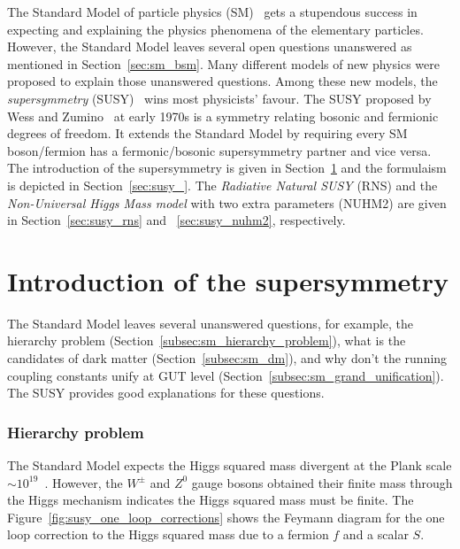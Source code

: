 The Standard Model of particle physics (SM)~\cite{BF02726525,0029-55826190469-2,PhysRevLett.19.1264,Herrero:1998eq,CBO9780511791406} gets a stupendous success in expecting and explaining the physics phenomena of the elementary particles.
However, the Standard Model leaves several open questions unanswered as mentioned in Section~\ref{sec:sm_bsm}.
Many different models of new physics were proposed to explain those unanswered questions.
Among these new models, the \textit{supersymmetry} (SUSY)~\cite{Wess:1974tw,Lykken:1996xt,Drees:1996ca,Martin:1997ns,Bilal:2001nv,Argyres:2001eva,Peskin:2008nw,CBO9780511619250,Shadmi:2017qdk} wins most physicists' favour.
The SUSY proposed by Wess and Zumino~\cite{Wess:1974tw} at early 1970s is a symmetry relating bosonic and fermionic degrees of freedom.
It extends the Standard Model by requiring every SM boson/fermion has a fermonic/bosonic supersymmetry partner and vice versa.
The introduction of the supersymmetry is given in Section~\ref{sec:susy_intro} and the formulaism is depicted in Section~\ref{sec:susy_}.
The \textit{Radiative Natural SUSY} (RNS) and the \textit{Non-Universal Higgs Mass model} with two extra parameters (NUHM2) are given in Section~\ref{sec:susy_rns} and ~\ref{sec:susy_nuhm2}, respectively.


\section{Introduction of the supersymmetry}
\label{sec:susy_intro}
The Standard Model leaves several unanswered questions, for example, the hierarchy problem (Section~\ref{subsec:sm_hierarchy_problem}), what is the candidates of dark matter (Section~\ref{subsec:sm_dm}), and why don't the running coupling constants unify at GUT level (Section~\ref{subsec:sm_grand_unification}).
The SUSY provides good explanations for these questions.


\subsubsection{Hierarchy problem}
\label{subsubsec:susy_hierarchy_problem}
The Standard Model expects the Higgs squared mass divergent at the Plank scale $\sim 10^{19}$~{\GeV}.
However, the $W^{\pm}$ and $Z^{0}$ gauge bosons obtained their finite mass through the Higgs mechanism indicates the Higgs squared mass must be finite.
The Figure~\ref{fig:susy_one_loop_corrections} shows the Feymann diagram for the one loop correction to the Higgs squared mass due to a fermion $f$ and a scalar $S$.

